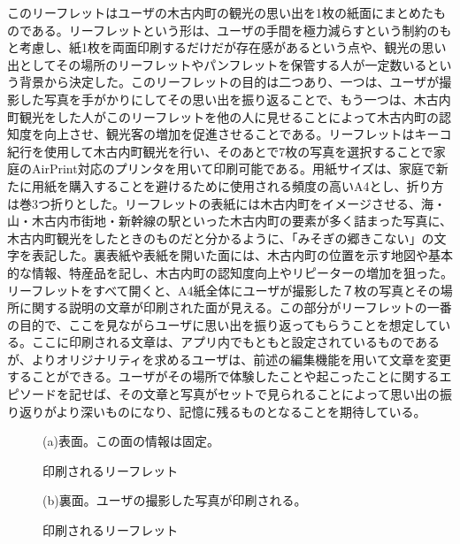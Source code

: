 このリーフレットはユーザの木古内町の観光の思い出を1枚の紙面にまとめたものである。リーフレットという形は、ユーザの手間を極力減らすという制約のもと考慮し、紙1枚を両面印刷するだけだが存在感があるという点や、観光の思い出としてその場所のリーフレットやパンフレットを保管する人が一定数いるという背景から決定した。このリーフレットの目的は二つあり、一つは、ユーザが撮影した写真を手がかりにしてその思い出を振り返ることで、もう一つは、木古内町観光をした人がこのリーフレットを他の人に見せることによって木古内町の認知度を向上させ、観光客の増加を促進させることである。リーフレットはキーコ紀行を使用して木古内町観光を行い、そのあとで7枚の写真を選択することで家庭のAirPrint対応のプリンタを用いて印刷可能である。用紙サイズは、家庭で新たに用紙を購入することを避けるために使用される頻度の高いA4とし、折り方は巻3つ折りとした。リーフレットの表紙には木古内町をイメージさせる、海・山・木古内市街地・新幹線の駅といった木古内町の要素が多く詰まった写真に、木古内町観光をしたときのものだと分かるように、「みそぎの郷きこない」の文字を表記した。裏表紙や表紙を開いた面には、木古内町の位置を示す地図や基本的な情報、特産品を記し、木古内町の認知度向上やリピーターの増加を狙った。リーフレットをすべて開くと、A4紙全体にユーザが撮影した７枚の写真とその場所に関する説明の文章が印刷された面が見える。この部分がリーフレットの一番の目的で、ここを見ながらユーザに思い出を振り返ってもらうことを想定している。ここに印刷される文章は、アプリ内でもともと設定されているものであるが、よりオリジナリティを求めるユーザは、前述の編集機能を用いて文章を変更することができる。ユーザがその場所で体験したことや起こったことに関するエピソードを記せば、その文章と写真がセットで見られることによって思い出の振り返りがより深いものになり、記憶に残るものとなることを期待している。

\begin{figure}[p]
\begin{center}
\hspace{1cm} (a)表面。この面の情報は固定。
\caption{印刷されるリーフレット}
\end{center}
\end{figure}

\begin{figure}[p]
\begin{center}
\hspace{1cm} (b)裏面。ユーザの撮影した写真が印刷される。
\caption{印刷されるリーフレット}
\end{center}
\end{figure}

